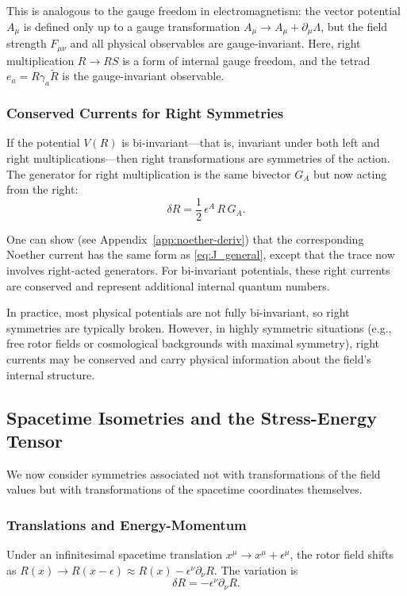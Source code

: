 \documentclass[11pt,a4paper]{article}
\numberwithin{equation}{section}
\theoremstyle{plain}
\theoremstyle{definition}
\theoremstyle{remark}
\begin{document}
This is analogous to the gauge freedom in electromagnetism: the vector potential $A_\mu$ is defined only up to a gauge transformation $A_\mu \to A_\mu + \partial_\mu\Lambda$, but the field strength $F_{\mu\nu}$ and all physical observables are gauge-invariant. Here, right multiplication $R \to RS$ is a form of internal gauge freedom, and the tetrad $e_a = R\gamma_a\widetilde{R}$ is the gauge-invariant observable.

\subsubsection{Conserved Currents for Right Symmetries}

If the potential $V(R)$ is bi-invariant---that is, invariant under both left and right multiplications---then right transformations are symmetries of the action. The generator for right multiplication is the same bivector $G_A$ but now acting from the right:
\begin{equation}
\delta R = \frac{1}{2}\,\epsilon^A\,R\,G_A.
\end{equation}

One can show (see Appendix~\ref{app:noether-deriv}) that the corresponding Noether current has the same form as \eqref{eq:J_general}, except that the trace now involves right-acted generators. For bi-invariant potentials, these right currents are conserved and represent additional internal quantum numbers.

In practice, most physical potentials are not fully bi-invariant, so right symmetries are typically broken. However, in highly symmetric situations (e.g., free rotor fields or cosmological backgrounds with maximal symmetry), right currents may be conserved and carry physical information about the field's internal structure.

\subsection{Spacetime Isometries and the Stress-Energy Tensor}

We now consider symmetries associated not with transformations of the field values but with transformations of the spacetime coordinates themselves.

\subsubsection{Translations and Energy-Momentum}

Under an infinitesimal spacetime translation $x^\mu \to x^\mu + \epsilon^\mu$, the rotor field shifts as $R(x) \to R(x - \epsilon) \approx R(x) - \epsilon^\nu \partial_\nu R$. The variation is
\begin{equation}
\delta R = -\epsilon^\nu \partial_\nu R.
\end{equation}
\end{document}

